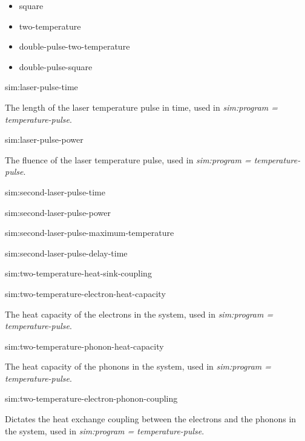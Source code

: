 \begin{itemize}
   \item[] square
   \item[] two-temperature
   \item[] double-pulse-two-temperature
   \item[] double-pulse-square
\end{itemize}

{\zicf sim:laser-pulse-time} The length of the laser temperature pulse in time, used in \textit{sim:program = temperature-pulse}.

{\zicf sim:laser-pulse-power} The fluence of the laser temperature pulse, used in \textit{sim:program = temperature-pulse}.

{\zicf sim:second-laser-pulse-time}

{\zicf sim:second-laser-pulse-power}

{\zicf sim:second-laser-pulse-maximum-temperature}

{\zicf sim:second-laser-pulse-delay-time}

{\zicf sim:two-temperature-heat-sink-coupling}

{\zicf sim:two-temperature-electron-heat-capacity} The heat capacity of the electrons in the system, used in \textit{sim:program = temperature-pulse}.

{\zicf sim:two-temperature-phonon-heat-capacity} The heat capacity of the phonons in the system, used in \textit{sim:program = temperature-pulse}.

{\zicf sim:two-temperature-electron-phonon-coupling} 
Dictates the heat exchange coupling between the electrons and the phonons in the system, used in \newline\textit{sim:program = temperature-pulse}.


